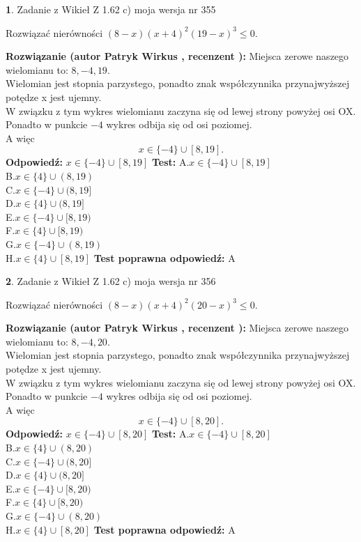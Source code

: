 \documentclass[12pt, a4paper]{article}
\theoremstyle{definition} %
\newtheorem{zad}{}
\newcommand{\zadStart}[1]{\begin{zad}#1\newline}
\newcommand{\zadStop}{\end{zad}}
\newcommand{\rozwStart}[2]{\noindent \textbf{Rozwiązanie (autor #1 , recenzent #2): }\newline}
\newcommand{\rozwStop}{\newline}
\newcommand{\odpStart}{\noindent \textbf{Odpowiedź:}\newline}
\newcommand{\odpStop}{\newline}
\newcommand{\testStart}{\noindent \textbf{Test:}\newline}
\newcommand{\testStop}{\newline}
\newcommand{\kluczStart}{\noindent \textbf{Test poprawna odpowiedź:}\newline}
\newcommand{\kluczStop}{\newline}
\begin{document}
\zadStart{Zadanie z Wikieł Z 1.62 c) moja wersja nr 355}

Rozwiązać nierówności $(8-x)(x+4)^{2}(19-x)^{3}\le0$.
\zadStop
\rozwStart{Patryk Wirkus}{}
Miejsca zerowe naszego wielomianu to: $8, -4, 19$.\\
Wielomian jest stopnia parzystego, ponadto znak współczynnika przy\linebreak najwyższej potędze x jest ujemny.\\ W związku z tym wykres wielomianu zaczyna się od lewej strony powyżej osi OX.\\
Ponadto w punkcie $-4$ wykres odbija się od osi poziomej.\\
A więc $$x \in \{-4\} \cup [8,19].$$
\rozwStop
\odpStart
$x \in \{-4\} \cup [8,19]$
\odpStop
\testStart
A.$x \in \{-4\} \cup [8,19]$\\
B.$x \in \{4\} \cup (8,19)$\\
C.$x \in \{-4\} \cup (8,19]$\\
D.$x \in \{4\} \cup (8,19]$\\
E.$x \in \{-4\} \cup [8,19)$\\
F.$x \in \{4\} \cup [8,19)$\\
G.$x \in \{-4\} \cup (8,19)$\\
H.$x \in \{4\} \cup [8,19]$
\testStop
\kluczStart
A
\kluczStop



\zadStart{Zadanie z Wikieł Z 1.62 c) moja wersja nr 356}

Rozwiązać nierówności $(8-x)(x+4)^{2}(20-x)^{3}\le0$.
\zadStop
\rozwStart{Patryk Wirkus}{}
Miejsca zerowe naszego wielomianu to: $8, -4, 20$.\\
Wielomian jest stopnia parzystego, ponadto znak współczynnika przy\linebreak najwyższej potędze x jest ujemny.\\ W związku z tym wykres wielomianu zaczyna się od lewej strony powyżej osi OX.\\
Ponadto w punkcie $-4$ wykres odbija się od osi poziomej.\\
A więc $$x \in \{-4\} \cup [8,20].$$
\rozwStop
\odpStart
$x \in \{-4\} \cup [8,20]$
\odpStop
\testStart
A.$x \in \{-4\} \cup [8,20]$\\
B.$x \in \{4\} \cup (8,20)$\\
C.$x \in \{-4\} \cup (8,20]$\\
D.$x \in \{4\} \cup (8,20]$\\
E.$x \in \{-4\} \cup [8,20)$\\
F.$x \in \{4\} \cup [8,20)$\\
G.$x \in \{-4\} \cup (8,20)$\\
H.$x \in \{4\} \cup [8,20]$
\testStop
\kluczStart
A
\kluczStop
\end{document}
